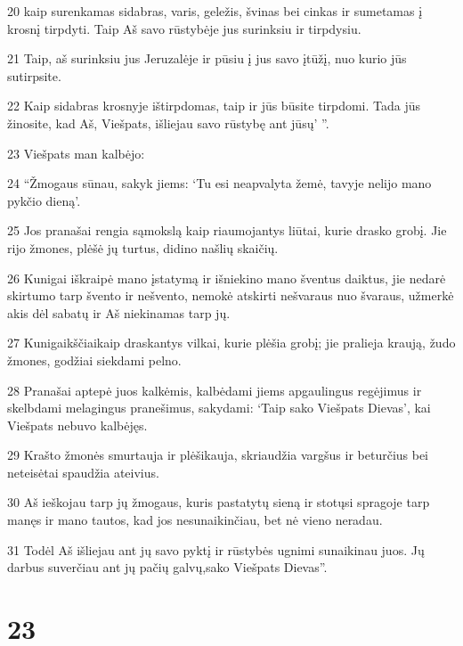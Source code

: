 \par 20 kaip surenkamas sidabras, varis, geležis, švinas bei cinkas ir sumetamas į krosnį tirpdyti. Taip Aš savo rūstybėje jus surinksiu ir tirpdysiu. 
\par 21 Taip, aš surinksiu jus Jeruzalėje ir pūsiu į jus savo įtūžį, nuo kurio jūs sutirpsite. 
\par 22 Kaip sidabras krosnyje ištirpdomas, taip ir jūs būsite tirpdomi. Tada jūs žinosite, kad Aš, Viešpats, išliejau savo rūstybę ant jūsų’ ”. 
\par 23 Viešpats man kalbėjo: 
\par 24 “Žmogaus sūnau, sakyk jiems: ‘Tu esi neapvalyta žemė, tavyje nelijo mano pykčio dieną’. 
\par 25 Jos pranašai rengia sąmokslą kaip riaumojantys liūtai, kurie drasko grobį. Jie rijo žmones, plėšė jų turtus, didino našlių skaičių. 
\par 26 Kunigai iškraipė mano įstatymą ir išniekino mano šventus daiktus, jie nedarė skirtumo tarp švento ir nešvento, nemokė atskirti nešvaraus nuo švaraus, užmerkė akis dėl sabatų ir Aš niekinamas tarp jų. 
\par 27 Kunigaikščiai­kaip draskantys vilkai, kurie plėšia grobį; jie pralieja kraują, žudo žmones, godžiai siekdami pelno. 
\par 28 Pranašai aptepė juos kalkėmis, kalbėdami jiems apgaulingus regėjimus ir skelbdami melagingus pranešimus, sakydami: ‘Taip sako Viešpats Dievas’, kai Viešpats nebuvo kalbėjęs. 
\par 29 Krašto žmonės smurtauja ir plėšikauja, skriaudžia vargšus ir beturčius bei neteisėtai spaudžia ateivius. 
\par 30 Aš ieškojau tarp jų žmogaus, kuris pastatytų sieną ir stotųsi spragoje tarp manęs ir mano tautos, kad jos nesunaikinčiau, bet nė vieno neradau. 
\par 31 Todėl Aš išliejau ant jų savo pyktį ir rūstybės ugnimi sunaikinau juos. Jų darbus suverčiau ant jų pačių galvų,­sako Viešpats Dievas”.



\chapter{23}


